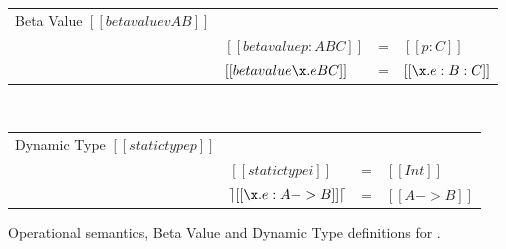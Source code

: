 \begin{figure}[t]
  \begin{small}
    \centering
  \end{small}
  \bigskip
  \begin{center}
  {\renewcommand{\arraystretch}{1.2}
    \begin{tabular}{|llcl|}
      \hline
      Beta Value $[[betavalue v A B]]$ &  & & \\
     & $[[betavalue p:A B C]]$ & = & $[[p:C]]$ \\
     & $[[betavalue \x.e B C]]$ & = & $[[\x.e:B:C]]$ \\
      \hline
    \end{tabular} } \\
  \bigskip
  {\renewcommand{\arraystretch}{1.2}
    \begin{tabular}{|llcl|}
      \hline
      Dynamic Type $[[statictype p]]$ &  & & \\
     & $[[statictype i]]$ & = & $[[Int]]$ \\
     & $\rceil [[\x.e: A -> B]] \lceil$ & = & $[[A -> B]]$ \\
      \hline
    \end{tabular} }
    \end{center}
  \caption{Operational semantics, Beta Value and Dynamic Type definitions for \cal.}
  \label{fig:union:os}
\end{figure}

